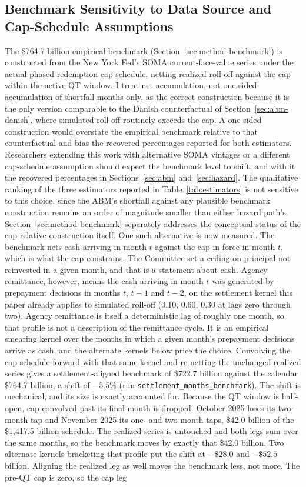 \documentclass[12pt]{article}
\begin{document}
\subsection{Benchmark Sensitivity to Data Source and Cap-Schedule Assumptions}\label{sec:robustness-benchmark}

The \$764.7 billion empirical benchmark (Section~\ref{sec:method-benchmark}) is constructed from the New York Fed's SOMA current-face-value series under the actual phased redemption cap schedule, netting realized roll-off against the cap within the active QT window. I treat net accumulation, not one-sided accumulation of shortfall months only, as the correct construction because it is the only version comparable to the Danish counterfactual of Section~\ref{sec:abm-danish}, where simulated roll-off routinely exceeds the cap. A one-sided construction would overstate the empirical benchmark relative to that counterfactual and bias the recovered percentages reported for both estimators. Researchers extending this work with alternative SOMA vintages or a different cap-schedule assumption should expect the benchmark level to shift, and with it the recovered percentages in Sections~\ref{sec:abm} and~\ref{sec:hazard}. The qualitative ranking of the three estimators reported in Table~\ref{tab:estimators} is not sensitive to this choice, since the ABM's shortfall against any plausible benchmark construction remains an order of magnitude smaller than either hazard path's. Section~\ref{sec:method-benchmark} separately addresses the conceptual status of the cap-relative construction itself. One such alternative is now measured. The benchmark nets cash arriving in month $t$ against the cap in force in month $t$, which is what the cap constrains. The Committee set a ceiling on principal not reinvested in a given month, and that is a statement about cash. Agency remittance, however, means the cash arriving in month $t$ was generated by prepayment decisions in months $t$, $t-1$ and $t-2$, on the settlement kernel this paper already applies to simulated roll-off (0.10, 0.60, 0.30 at lags zero through two). Agency remittance is itself a deterministic lag of roughly one month, so that profile is not a description of the remittance cycle. It is an empirical smearing kernel over the months in which a given month's prepayment decisions arrive as cash, and the alternate kernels below price the choice. Convolving the cap schedule forward with that same kernel and re-netting the unchanged realized series gives a settlement-aligned benchmark of \$722.7 billion against the calendar \$764.7 billion, a shift of $-5.5$\% (run \texttt{settlement\_months\_benchmark}). The shift is mechanical, and its size is exactly accounted for. Because the QT window is half-open, cap convolved past its final month is dropped. October 2025 loses its two-month tap and November 2025 its one- and two-month taps, \$42.0 billion of the \$1{,}417.5 billion schedule. The realized series is untouched and both legs sum over the same months, so the benchmark moves by exactly that \$42.0 billion. Two alternate kernels bracketing that profile put the shift at $-\$28.0$ and $-\$52.5$ billion. Aligning the realized leg as well moves the benchmark less, not more. The pre-QT cap is zero, so the cap leg 
\end{document}
